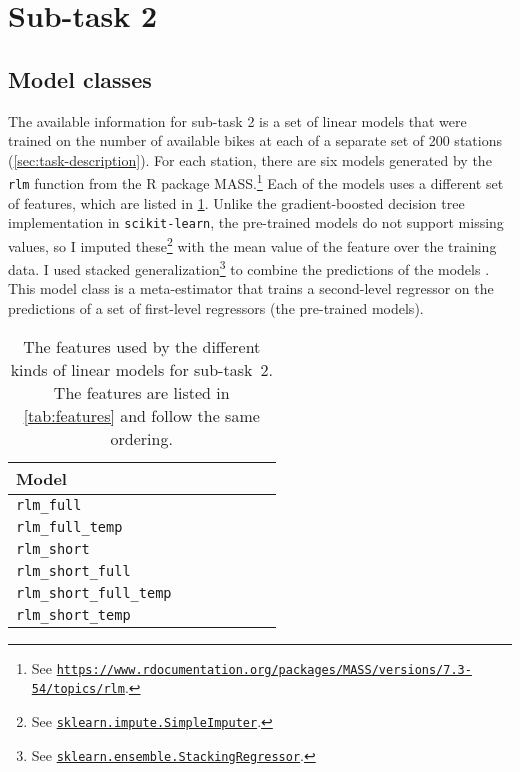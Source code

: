 \documentclass[11pt]{extarticle}
\newcommand{\bikesavgfull}{\texttt{bikes\_avg\_full}}
\newcommand{\bikesavgshort}{\texttt{bikes\_avg\_short}}
\newcommand{\bikesh}{\texttt{bikes\_3h}}
\newcommand{\bikeshdiffavgfull}{\texttt{bikes\_3h\_diff\_avg\_full}}
\newcommand{\bikeshdiffavgshort}{\texttt{bikes\_3h\_diff\_avg\_short}}
\newcommand{\rlmfull}{\texttt{rlm\_full}}
\newcommand{\rlmfulltemp}{\texttt{rlm\_full\_temp}}
\newcommand{\rlmshort}{\texttt{rlm\_short}}
\newcommand{\rlmshortfull}{\texttt{rlm\_short\_full}}
\newcommand{\rlmshortfulltemp}{\texttt{rlm\_short\_full\_temp}}
\newcommand{\rlmshorttemp}{\texttt{rlm\_short\_temp}}
\newcommand{\sklearn}[2]{\href{https://scikit-learn.org/stable/modules/generated/sklearn.#1.#2.html}{\lstinline|sklearn.#1.#2|}}
\begin{document}
\section{Sub-task 2}
\label{sec:subtask-2}

\subsection{Model classes}
\label{sec:subtask-2:model-classes}

The available information for sub-task 2 is a set of linear models that were trained on
the number of available bikes at each of a separate set of 200 stations
(\cref{sec:task-description}).
For each station, there are six models generated by the \texttt{rlm} function from the
R package MASS.\footnote{See
  \href{https://www.rdocumentation.org/packages/MASS/versions/7.3-54/topics/rlm}{\texttt{https://www.rdocumentation.org/packages/MASS/versions/7.3-54/topics/rlm}}.
}
Each of the models uses a different set of features, which are listed in
\cref{tab:2:features}.
Unlike the gradient-boosted decision tree implementation in \texttt{scikit-learn}, the
pre-trained models do not support missing values, so I imputed these\footnote{See
  \sklearn{impute}{SimpleImputer}.
} with the mean value of the feature over the training data.
I used stacked generalization\footnote{See \sklearn{ensemble}{StackingRegressor}.
} to combine the predictions of the models \parencite{Wolpert1992}.
This model class is a meta-estimator that trains a second-level regressor on the
predictions of a set of first-level regressors (the pre-trained models).

\begin{table}
  \centering
  \newcommand{\rlmtablerow}[7]{#1 & #7 & #2 & #3 & #4 & #5 & #6 \\}
  \begin{tabular}{lllllll}

    \rlmtablerow{Model}{\rot{\bikesh{}}}{\rot{\bikesavgfull{}}}{\rot{\bikesavgshort{}}}{\rot{\bikeshdiffavgfull{}}}{\rot{\bikeshdiffavgshort{}}}{\rot{\texttt{temperature}}}

    \midrule

    \rlmtablerow{\rlmfull{}}{\checkmark}{\checkmark}{}{\checkmark}{}{}

    \rlmtablerow{\rlmfulltemp{}}{\checkmark}{\checkmark}{}{\checkmark}{}{\checkmark}

    \rlmtablerow{\rlmshort{}}{\checkmark}{}{\checkmark}{}{\checkmark}{}

    \rlmtablerow{\rlmshortfull{}}{\checkmark}{\checkmark}{\checkmark}{\checkmark}{\checkmark}{}

    \rlmtablerow{\rlmshortfulltemp{}}{\checkmark}{\checkmark}{\checkmark}{\checkmark}{\checkmark}{\checkmark}

    \rlmtablerow{\rlmshorttemp{}}{\checkmark}{}{\checkmark}{}{\checkmark}{\checkmark}

    \bottomrule
  \end{tabular}
  \caption{The features used by the different kinds of linear
    models for sub-task~2.
    The features are listed in \cref{tab:features} and follow the same ordering.
  }
  \label{tab:2:features}
\end{table}
\end{document}
